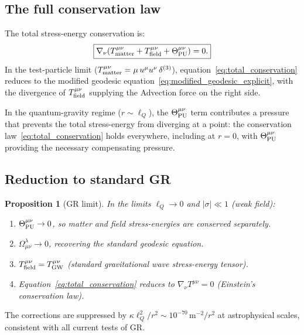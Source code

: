 \documentclass[11pt,a4paper]{article}
\theoremstyle{plain}
\newtheorem{proposition}[theorem]{Proposition}
\theoremstyle{definition}
\theoremstyle{remark}
\newcommand{\lQ}{\ell_Q}
\begin{document}
\subsection{The full conservation law}

The total stress-energy conservation is:
\begin{equation}
  \boxed{
  \nabla_\nu\!\left(
    T^{\mu\nu}_{\rm matter}
    + T^{\mu\nu}_{\rm field}
    + \Theta^{\mu\nu}_{\rm PU}
  \right) = 0.
  }
  \label{eq:total_conservation}
\end{equation}
In the test-particle limit ($T^{\mu\nu}_{\rm matter} = \mu\,u^\mu u^\nu\,\delta^{(3)}$),
equation~\eqref{eq:total_conservation} reduces to the modified geodesic
equation~\eqref{eq:modified_geodesic_explicit}, with the divergence of
$T^{\mu\nu}_{\rm field}$ supplying the Advection force on the right side.

In the quantum-gravity regime ($r \sim \lQ$), the $\Theta^{\mu\nu}_{\rm PU}$ term
contributes a pressure that prevents the total stress-energy from diverging at a
point: the conservation law~\eqref{eq:total_conservation} holds everywhere, including
at $r = 0$, with $\Theta^{\mu\nu}_{\rm PU}$ providing the necessary compensating
pressure.

\subsection{Reduction to standard GR}

\begin{proposition}[GR limit]
\label{prop:GR_limit}
In the limits $\lQ \to 0$ and $|\sigma| \ll 1$ (weak field):
\begin{enumerate}[nosep]
  \item $\Theta^{\mu\nu}_{\rm PU} \to 0$, so matter and field stress-energies
    are conserved separately.
  \item $\Omega^\lambda_{\mu\nu} \to 0$, recovering the standard geodesic equation.
  \item $T^{\mu\nu}_{\rm field} = T^{\mu\nu}_{\rm GW}$ (standard gravitational
    wave stress-energy tensor).
  \item Equation~\eqref{eq:total_conservation} reduces to $\nabla_\nu T^{\mu\nu} = 0$
    (Einstein's conservation law).
\end{enumerate}
\end{proposition}

The corrections are suppressed by $\kappa\lQ^2/r^2 \sim 10^{-70}\,\mathrm{m}^{-2}/r^2$
at astrophysical scales, consistent with all current tests of GR.
\end{document}
